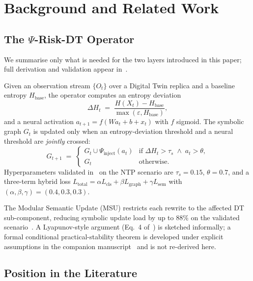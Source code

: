 \documentclass[runningheads]{llncs}
\newcommand{\psiop}{\ensuremath{\Psi}}
\newcommand{\EntropyDeviation}{\ensuremath{\Delta H}}
\newcommand{\taus}{\ensuremath{\tau_{s}}}
\begin{document}
\section{Background and Related Work}
\label{sec:background}

\subsection{The \texorpdfstring{$\psiop$}{Psi}-Risk-DT Operator}

We summarise only what is needed for the two layers introduced in this
paper; full derivation and validation appear in~\cite{paper3}.

Given an observation stream $\{O_t\}$ over a Digital Twin replica and a
baseline entropy $H_{\mathrm{base}}$, the operator computes an entropy
deviation
\begin{equation}
\EntropyDeviation_t \;=\; \frac{H(X_t) - H_{\mathrm{base}}}{\max(\varepsilon,
H_{\mathrm{base}})},
\label{eq:dh}
\end{equation}
and a neural activation
$a_{t+1} = f(W a_t + b + x_t)$ with $f$ sigmoid. The symbolic graph
$G_t$ is updated only when an entropy-deviation threshold and a neural
threshold are \emph{jointly} crossed:
\begin{equation}
G_{t+1} \;=\;
\begin{cases}
G_t \cup \psiop_{\mathrm{inject}}(a_t) & \text{if } \EntropyDeviation_t > \taus
                                          \;\wedge\; a_t > \theta,\\
G_t                                    & \text{otherwise.}
\end{cases}
\label{eq:gate}
\end{equation}
Hyperparameters validated in~\cite{paper3} on the NTP scenario are
$\taus = 0.15$, $\theta = 0.7$, and a three-term hybrid loss
$L_{\mathrm{total}} = \alpha L_{\mathrm{cls}} + \beta L_{\mathrm{graph}}
+ \gamma L_{\mathrm{sem}}$ with $(\alpha,\beta,\gamma)=(0.4,0.3,0.3)$.

The Modular Semantic Update (MSU) restricts each rewrite to the affected
DT sub-component, reducing symbolic update load by up to 88\% on the
validated scenario~\cite{paper3}. A Lyapunov-style argument
(Eq.~4 of~\cite{paper3}) is sketched informally; a formal conditional
practical-stability theorem is developed under explicit assumptions in
the companion manuscript~\cite{paper5} and is not re-derived here.

\subsection{Position in the Literature}
\end{document}
